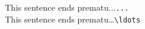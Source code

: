 \documentclass[crop]{standalone}
\begin{document}
\noindent
This sentence ends prematu...\hfill\verb|...|\\[12pt]
\noindent
This sentence ends prematu\ldots\hfill\verb|\ldots|
\end{document}
